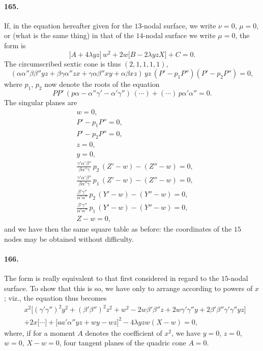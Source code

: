 \documentclass[11pt,a4paper]{article}
\begin{document}
\paragraph{165.}
If, in the equation hereafter given for the $13$-nodal surface, we write
$\nu = 0$, $\mu = 0$, or (what is the same thing) in that of the
$14$-nodal surface we write $\mu = 0$, the form is
\[
\bigl[A + 4\lambda yz\bigr]\, w^2 + 2 w \bigl[B - 2\lambda yz X\bigr] + C = 0.
\]
The circumscribed sextic cone is thus $(2, 1, 1, 1, 1)$,
\[
(\alpha\alpha''\beta\beta'' yz + \beta\gamma\alpha'' zx
+ \gamma\alpha\beta'' xy + \alpha\beta xz)\, yz\, (P' - p_1 P'')(P' - p_2 P'') = 0,
\]
where $p_1$, $p_2$ now denote the roots of the equation
\[
PP'\,(p\alpha - \alpha''\gamma' - \alpha'\gamma'')\,(\dotsb)
+ (\dotsb)\, p\alpha'\alpha'' = 0.
\]
The singular planes are
\[
\begin{aligned}
&w = 0, \\
&P' - p_1 P'' = 0, \\
&P' - p_2 P'' = 0, \\
&z = 0, \\
&y = 0, \\
&\tfrac{\gamma'\alpha'\beta''}{\beta\alpha''\gamma}\, p_2\, (Z' - w) - (Z'' - w) = 0, \\
&\tfrac{\gamma'\alpha'\beta''}{\beta\alpha''\gamma}\, p_1\, (Z' - w) - (Z'' - w) = 0, \\
&\tfrac{\beta'\gamma''}{\alpha'\alpha''}\, p_2\, (Y' - w) - (Y'' - w) = 0, \\
&\tfrac{\beta'\gamma''}{\alpha'\alpha''}\, p_1\, (Y' - w) - (Y'' - w) = 0, \\
&Z - w = 0,
\end{aligned}
\]
and we have then the same square table as before: the coordinates of the
$15$ nodes may be obtained without difficulty.

\paragraph{166.}
The form is really equivalent to that first considered in regard to the
$15$-nodal surface. To show that this is so, we have only to arrange
according to powers of $x$; viz., the equation thus becomes
\[
\begin{aligned}
& x^2 \bigl[(\gamma'\gamma'')^2 y^2 + (\beta'\beta'')^2 z^2
+ w^2 - 2 w\beta'\beta'' z + 2 w\gamma'\gamma'' y + 2\beta'\beta''\gamma'\gamma'' yz\bigr] \\
& + 2x\bigl[\dotsb\bigr] + \bigl[aa'\alpha'' yz + wy - wz\bigr]^2
- 4\lambda yz w (X - w) = 0,
\end{aligned}
\]
where, if for a moment $A$ denotes the coefficient of $x^2$, we have
$y = 0$, $z = 0$, $w = 0$, $X - w = 0$, four tangent planes of the quadric
cone $A = 0$.
\end{document}
